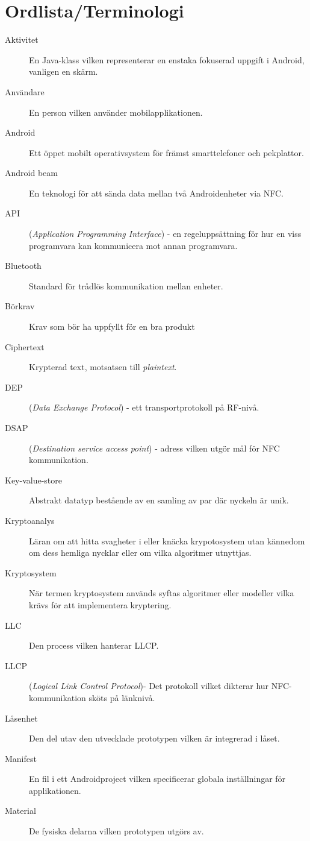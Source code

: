 \documentclass[11pt]{article}
\begin{document}
\section*{Ordlista/Terminologi}
\begin{description}
\item[Aktivitet] En Java-klass vilken representerar en enstaka fokuserad uppgift i Android, vanligen en skärm.
\item[Användare] En person vilken använder mobilapplikationen.
\item[Android] Ett öppet mobilt operativsystem för främst smarttelefoner och pekplattor.
\item[Android beam] En teknologi för att sända data mellan två Androidenheter via NFC.
\item[API] (\textit{Application Programming Interface}) - en regeluppsättning för hur en viss programvara kan kommunicera mot annan programvara.
\item[Bluetooth] Standard för trådlös kommunikation mellan enheter.
\item[Börkrav] Krav som bör ha uppfyllt för en bra produkt
\item[Ciphertext] Krypterad text, motsatsen till \textit{plaintext}.
\item[DEP](\textit{Data Exchange Protocol}) - ett transportprotokoll på RF-nivå.
\item[DSAP] (\textit{Destination service access point}) - adress vilken utgör mål för NFC kommunikation.
\item[Key-value-store] Abstrakt datatyp bestående av en samling av par där nyckeln är unik.
\item[Kryptoanalys] Läran om att hitta svagheter i eller knäcka krypotosystem utan kännedom om dess hemliga nycklar eller om vilka algoritmer utnyttjas. 
\item[Kryptosystem] När termen kryptosystem används syftas algoritmer eller modeller vilka krävs för att implementera kryptering. 
\item[LLC] Den process vilken hanterar LLCP.
\item[LLCP](\textit{Logical Link Control Protocol})- Det protokoll vilket dikterar hur NFC-kommunikation sköts på länknivå.
\item[Låsenhet] Den del utav den utvecklade prototypen vilken är integrerad i låset.
\item[Manifest] En fil i ett Androidproject vilken specificerar globala inställningar för applikationen.
\item[Material] De fysiska delarna vilken prototypen utgörs av.

\end{description}
\end{document}
